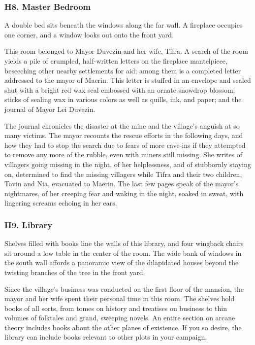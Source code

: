 \documentclass[10pt,a4paper,twoside,bg=print,twocolumn,openany,nodeprecatedcode]{dndbook}
\begin{document}
\subsubsection{H8. Master Bedroom}
\begin{DndReadAloud}{}
A double bed sits beneath the windows along the far wall. A fireplace occupies one corner, and a window looks out onto the front yard.

\end{DndReadAloud}

This room belonged to Mayor Duvezin and her wife, Tifra. A search of the room yields a pile of crumpled, half-written letters on the fireplace mantelpiece, beseeching other nearby settlements for aid; among them is a completed letter addressed to the mayor of Maerin. This letter is stuffed in an envelope and sealed shut with a bright red wax seal embossed with an ornate snowdrop blossom; sticks of sealing wax in various colors as well as quills, ink, and paper; and the journal of Mayor Lei Duvezin.

The journal chronicles the disaster at the mine and the village's anguish at so many victims. The mayor recounts the rescue efforts in the following days, and how they had to stop the search due to fears of more cave-ins if they attempted to remove any more of the rubble, even with miners still missing. She writes of villagers going missing in the night, of her helplessness, and of stubbornly staying on, determined to find the missing villagers while Tifra and their two children, Tavin and Nia, evacuated to Maerin. The last few pages speak of the mayor's nightmares, of her creeping fear and waking in the night, soaked in sweat, with lingering screams echoing in her ears.

\subsubsection{H9. Library}
\begin{DndReadAloud}{}
Shelves filled with books line the walls of this library, and four wingback chairs sit around a low table in the center of the room. The wide bank of windows in the south wall affords a panoramic view of the dilapidated houses beyond the twisting branches of the tree in the front yard.

\end{DndReadAloud}

Since the village's business was conducted on the first floor of the mansion, the mayor and her wife spent their personal time in this room. The shelves hold books of all sorts, from tomes on history and treatises on business to thin volumes of folktales and grand, sweeping novels. An entire section on arcane theory includes books about the other planes of existence. If you so desire, the library can include books relevant to other plots in your campaign.
\end{document}

